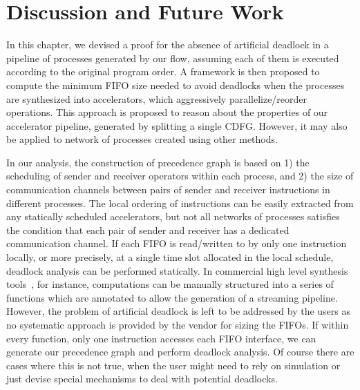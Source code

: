 \section{Discussion and Future Work}
In this chapter, we devised a proof for the absence of artificial deadlock in a pipeline of processes
generated by our flow, assuming each of them is executed according to the original program order. A framework is then proposed to compute the minimum FIFO size needed to avoid deadlocks when the processes are synthesized into accelerators, which aggressively parallelize/reorder operations. This approach is proposed to reason about the properties of our accelerator pipeline, generated by
splitting a single CDFG. However, it may also be applied to network of processes
created using other methods.

In our analysis, the construction of precedence graph is based on 1) the scheduling of sender and receiver operators within each process, and 2) the size of communication channels between pairs of sender and receiver instructions in different processes.
The local ordering of instructions can be easily extracted from any statically scheduled accelerators, but not all networks of processes satisfies the condition that each pair of
sender and receiver has a dedicated communication channel. If each FIFO is read/written to by only one instruction locally, or more precisely, at a single time slot allocated in the local schedule,  
deadlock analysis can be performed statically. In commercial high level synthesis tools~\cite{tools:vivadohls}, for instance, computations can be manually structured into a series of functions which are annotated to allow the generation of a streaming pipeline. However, the problem of artificial deadlock is left to be addressed by the users as no systematic approach is provided by the vendor for sizing the FIFOs. If within every function, only one instruction accesses each FIFO interface, we can generate our precedence graph and perform deadlock analysis. Of course there are cases where this is not true, when the user might need to rely on simulation or just devise special mechanisms to deal with potential deadlocks.



